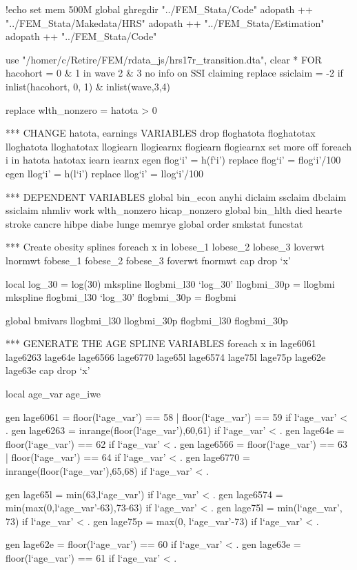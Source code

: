 \documentclass{article}
\begin{document}
\begin{Statacode}{!echo}
set mem 500M
global ghregdir "../FEM_Stata/Code"
adopath ++ "../FEM_Stata/Makedata/HRS"
adopath ++ "../FEM_Stata/Estimation"
adopath ++ "../FEM_Stata/Code"

use "/homer/c/Retire/FEM/rdata_js/hrs17r_transition.dta", clear
* FOR hacohort = 0 & 1 in wave 2 & 3 no info on SSI claiming
replace ssiclaim = -2 if inlist(hacohort, 0, 1) & inlist(wave,3,4)

replace wlth_nonzero = hatota > 0

*** CHANGE hatota, earnings VARIABLES
drop floghatota floghatotax lloghatota lloghatotax llogiearn llogiearnx flogiearn flogiearnx
set more off
foreach i in hatota hatotax iearn iearnx{
  egen flog`i' = h(f`i')
  replace flog`i' = flog`i'/100
  egen llog`i' = h(l`i')
  replace llog`i' = llog`i'/100
}


*** DEPENDENT VARIABLES
global bin_econ anyhi diclaim ssclaim dbclaim ssiclaim nhmliv work wlth_nonzero hicap_nonzero
global bin_hlth died hearte stroke cancre hibpe diabe lunge memrye
global order smkstat funcstat


*** Create obesity splines
foreach x in lobese_1 lobese_2 lobese_3 loverwt lnormwt fobese_1 fobese_2 fobese_3 foverwt fnormwt {
  cap drop `x'
}

local log_30 = log(30)
mkspline llogbmi_l30 `log_30' llogbmi_30p = llogbmi
mkspline flogbmi_l30 `log_30' flogbmi_30p = flogbmi

global bmivars llogbmi_l30 llogbmi_30p flogbmi_l30 flogbmi_30p


*** GENERATE THE AGE SPLINE VARIABLES
foreach x in lage6061 lage6263 lage64e lage6566 lage6770 lage65l lage6574 lage75l lage75p lage62e lage63e {
  cap drop `x'
}

local age_var age_iwe

gen lage6061 = floor(l`age_var') == 58 | floor(l`age_var') == 59 if l`age_var' < .
gen lage6263 = inrange(floor(l`age_var'),60,61) if l`age_var' < .
gen lage64e = floor(l`age_var') == 62 if l`age_var' < . 
gen lage6566 = floor(l`age_var') == 63 | floor(l`age_var') == 64 if l`age_var' < .
gen lage6770 = inrange(floor(l`age_var'),65,68) if l`age_var' < . 

gen lage65l  = min(63,l`age_var') if l`age_var' < .
gen lage6574 = min(max(0,l`age_var'-63),73-63) if l`age_var' < .
gen lage75l = min(l`age_var', 73) if l`age_var' < . 
gen lage75p = max(0, l`age_var'-73) if l`age_var' < . 

gen lage62e = floor(l`age_var') == 60 if l`age_var' < .
gen lage63e = floor(l`age_var') == 61 if l`age_var' < .


\end{Statacode}
\end{document}
